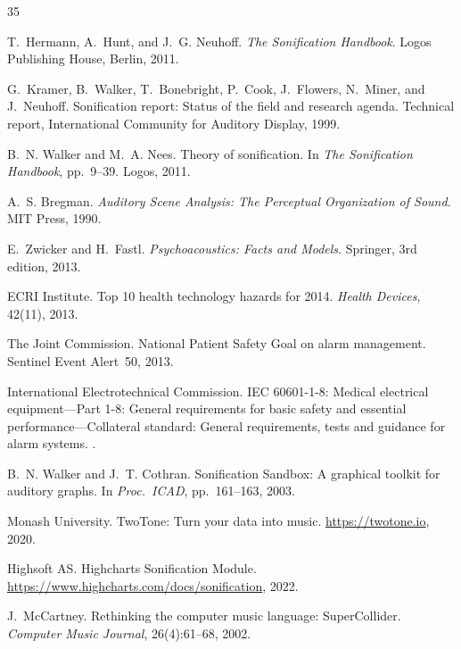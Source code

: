 \documentclass[sigchi, nonacm]{acmart}
\begin{document}
\begin{thebibliography}{35}

T.~Hermann, A.~Hunt, and J.~G. Neuhoff.
\newblock \emph{The Sonification Handbook}.
\newblock Logos Publishing House, Berlin, 2011.

G.~Kramer, B.~Walker, T.~Bonebright, P.~Cook, J.~Flowers, N.~Miner, and J.~Neuhoff.
\newblock Sonification report: Status of the field and research agenda.
\newblock Technical report, International Community for Auditory Display, 1999.

B.~N. Walker and M.~A. Nees.
\newblock Theory of sonification.
\newblock In \emph{The Sonification Handbook}, pp.~9--39. Logos, 2011.

A.~S. Bregman.
\newblock \emph{Auditory Scene Analysis: The Perceptual Organization of Sound}.
\newblock MIT Press, 1990.

E.~Zwicker and H.~Fastl.
\newblock \emph{Psychoacoustics: Facts and Models}.
\newblock Springer, 3rd edition, 2013.

{ECRI Institute}.
\newblock Top 10 health technology hazards for 2014.
\newblock \emph{Health Devices}, 42(11), 2013.

{The Joint Commission}.
\newblock National Patient Safety Goal on alarm management.
\newblock Sentinel Event Alert~50, 2013.

{International Electrotechnical Commission}.
\newblock IEC 60601-1-8: Medical electrical equipment---Part 1-8: General requirements for basic safety and essential performance---Collateral standard: General requirements, tests and guidance for alarm systems.
.

B.~N. Walker and J.~T. Cothran.
\newblock Sonification Sandbox: A graphical toolkit for auditory graphs.
\newblock In \emph{Proc.\ ICAD}, pp.~161--163, 2003.

{Monash University}.
\newblock TwoTone: Turn your data into music.
\newblock \url{https://twotone.io}, 2020.

{Highsoft AS}.
\newblock Highcharts Sonification Module.
\newblock \url{https://www.highcharts.com/docs/sonification}, 2022.

J.~McCartney.
\newblock Rethinking the computer music language: SuperCollider.
\newblock \emph{Computer Music Journal}, 26(4):61--68, 2002.


\end{thebibliography}
\end{document}
